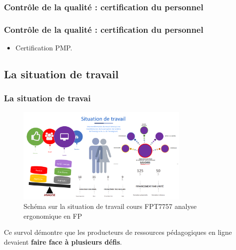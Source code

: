 					\subsubsection{Contrôle de la qualité : certification du personnel} 
							\begin{frame}[allowframebreaks]
							\frametitle{Contrôle de la qualité : certification du personnel}
                        			
							\begin{itemize}
							\item Certification PMP.
							\end{itemize}						
					\end{frame}	
								
				\subsection{La situation de travail} 
						\begin{frame}[allowframebreaks]
						\frametitle{La situation de travai}
                        			\begin{figure}
                     			\centering
                    			 \includegraphics[width = 0.75\textwidth]{situation.png}
                     			\caption{\tiny{Schéma sur la situation de travail cours FPT7757 analyse ergonomique en FP}}
                   			\end{figure}
                        			Ce survol démontre que les producteurs de ressources pédagogiques en ligne devaient \textbf{faire face à plusieurs défis}. 
						
						\end{frame}	
													
